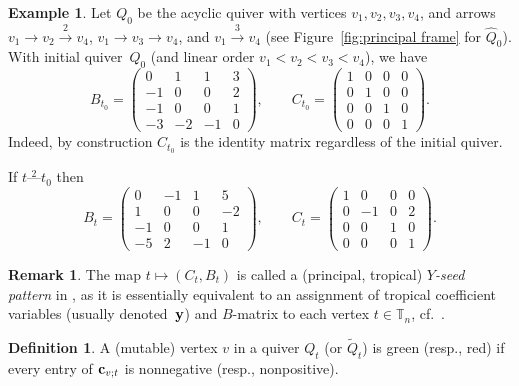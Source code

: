 \documentclass[11pt, letterpaper]{amsart}
\theoremstyle{definition}
\newtheorem{remark}[theorem]{Remark}
\newtheorem{example}[theorem]{Example}
\newtheorem{definition}[theorem]{Definition}
\numberwithin{equation}{section}
\begin{document}
\begin{example}
Let $Q_0$ be the acyclic quiver with vertices $v_1,v_2,v_3,v_4$, and arrows $v_1 \stackrel{}{\rightarrow} v_2 \stackrel{2}{\rightarrow} v_4$, $v_1\stackrel{}{\rightarrow} v_3 \stackrel{}{\rightarrow} v_4$, and $v_1 \stackrel{3}{\rightarrow} v_4$ (see Figure~\ref{fig:principal frame} for $\widehat Q_0$).
With initial quiver~$Q_0$ (and linear order $v_1 < v_2 < v_3 <v_4$), we have
$$ B_{t_0} = \begin{pmatrix} 0 & 1 & 1 & 3 \\ -1 & 0 & 0 & 2 \\ -1 & 0 & 0 & 1 \\ -3 & - 2 & - 1 & 0\end{pmatrix}, \quad \quad C_{t_0} = \begin{pmatrix} 1 & 0 & 0 & 0 \\ 0 & 1 & 0 & 0 \\ 0 & 0 & 1 & 0 \\ 0 & 0 & 0 & 1\end{pmatrix}.$$
Indeed, by construction $C_{t_0}$ is the identity matrix regardless of the initial quiver.

If $t \stackrel{2}{\text{---}} t_0$ then
$$ B_t = \begin{pmatrix} 0 & -1 & 1 & 5 \\ 1 & 0 & 0 & -2 \\ -1 & 0 & 0 & 1 \\ -5 & 2 & - 1 & 0\end{pmatrix}, \quad \quad C_t = \begin{pmatrix} 1 & 0 & 0 & 0 \\ 0 & -1 & 0 & 2 \\ 0 & 0 & 1 & 0 \\ 0 & 0 & 0 & 1\end{pmatrix}.$$
\end{example}

\begin{remark}
The map $t \mapsto (C_t, B_t)$ is called a (principal, tropical) \emph{$Y$-seed pattern} in \cite{SevenAMatrices}, 
as it is essentially equivalent to an assignment of tropical coefficient variables (usually denoted~$\bold y$) 
and $B$-matrix to each vertex $t\in \mathbb T_n$, cf.\ \cite[Proposition~3.6.5]{CAtextbook1-3}.  
\end{remark}

\begin{definition}
\label{def:redgreen}
A (mutable) vertex $v$ in a quiver $Q_t$ (or $\tilde Q_t$) is green (resp., red) if every entry of $\bold c_{v;t}$ is nonnegative (resp., nonpositive).
\end{definition}
\end{document}
